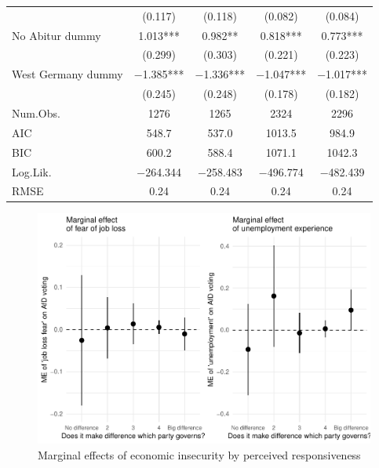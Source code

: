 \documentclass[
]{article}
\begin{document}
\begin{table}[!h]
\begin{tabular}[t]{lcccc}
 & (\num{0.117}) & (\num{0.118}) & (\num{0.082}) & (\num{0.084})\\
No Abitur dummy & \num{1.013}*** & \num{0.982}** & \num{0.818}*** & \num{0.773}***\\
 & (\num{0.299}) & (\num{0.303}) & (\num{0.221}) & (\num{0.223})\\
West Germany dummy & \num{-1.385}*** & \num{-1.336}*** & \num{-1.047}*** & \num{-1.017}***\\
 & (\num{0.245}) & (\num{0.248}) & (\num{0.178}) & (\num{0.182})\\
\midrule
Num.Obs. & \num{1276} & \num{1265} & \num{2324} & \num{2296}\\
AIC & \num{548.7} & \num{537.0} & \num{1013.5} & \num{984.9}\\
BIC & \num{600.2} & \num{588.4} & \num{1071.1} & \num{1042.3}\\
Log.Lik. & \num{-264.344} & \num{-258.483} & \num{-496.774} & \num{-482.439}\\
RMSE & \num{0.24} & \num{0.24} & \num{0.24} & \num{0.24}\\
\bottomrule
\end{tabular}
\end{table}

\begin{figure}
\centering
\includegraphics{AVCD_Final-Assignment-Edenhofer_files/figure-latex/regression-results-1-plot1-1.pdf}
\caption{Marginal effects of economic insecurity by perceived
responsiveness}
\end{figure}
\end{document}
